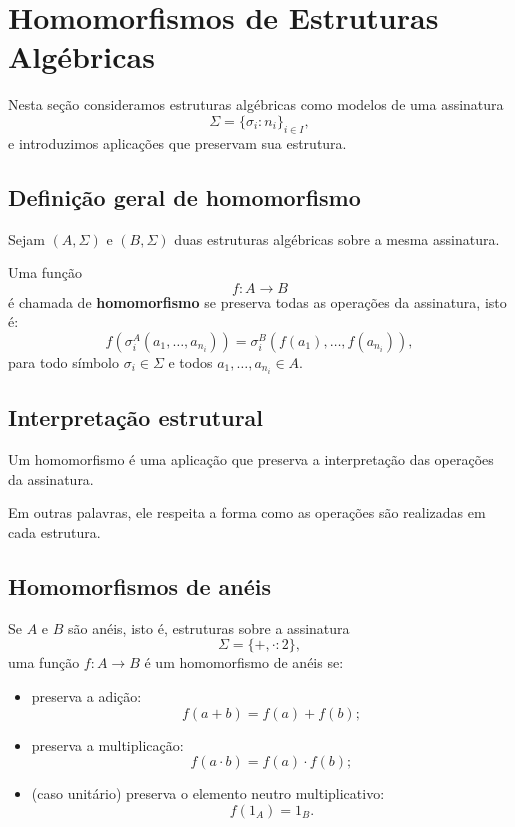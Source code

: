 \documentclass[../../main]{subfiles}
\begin{document}
\section{Homomorfismos de Estruturas Algébricas}
\label{sec:matematica:algebra:estruturas-algebricas:homomorfismos}

Nesta seção consideramos estruturas algébricas como modelos de uma assinatura
\[
	\Sigma = \{\sigma_i : n_i\}_{i \in I},
\]
e introduzimos aplicações que preservam sua estrutura.

\subsection{Definição geral de homomorfismo}

Sejam $(A, \Sigma)$ e $(B, \Sigma)$ duas estruturas algébricas sobre a mesma assinatura.

Uma função
\[
	f : A \to B
\]
é chamada de \textbf{homomorfismo} se preserva todas as operações da assinatura, isto é:
\[
	f(\sigma_i^A(a_1,\dots,a_{n_i})) =
	\sigma_i^B(f(a_1),\dots,f(a_{n_i})),
\]
para todo símbolo $\sigma_i \in \Sigma$ e todos $a_1,\dots,a_{n_i} \in A$.

\subsection{Interpretação estrutural}

Um homomorfismo é uma aplicação que preserva a interpretação das operações da assinatura.

Em outras palavras, ele respeita a forma como as operações são realizadas em cada estrutura.

\subsection{Homomorfismos de anéis}

Se $A$ e $B$ são anéis, isto é, estruturas sobre a assinatura
\[
	\Sigma = \{+, \cdot : 2\},
\]
uma função $f : A \to B$ é um homomorfismo de anéis se:

\begin{itemize}
	\item preserva a adição:
	      \[
		      f(a+b) = f(a) + f(b);
	      \]

	\item preserva a multiplicação:
	      \[
		      f(a \cdot b) = f(a) \cdot f(b);
	      \]

	\item (caso unitário) preserva o elemento neutro multiplicativo:
	      \[
		      f(1_A) = 1_B.
	      \]
\end{itemize}
\end{document}

